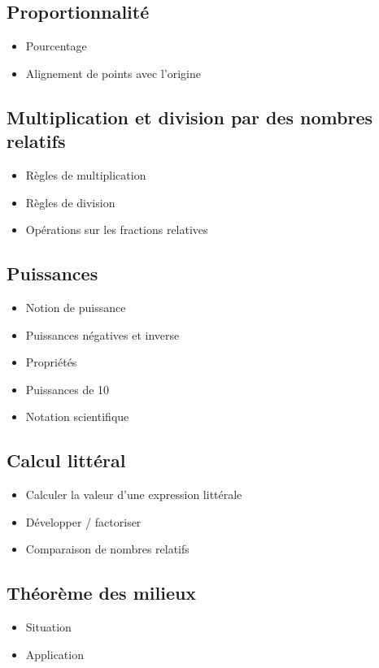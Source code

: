 \subsection{Proportionnalité}

\begin{itemize}
	\item Pourcentage
	\item Alignement de points avec l'origine
\end{itemize}

\subsection{Multiplication et division par des nombres relatifs}
\begin{itemize}
	\item Règles de multiplication
	\item Règles de division
	\item Opérations sur les fractions relatives
\end{itemize}

\subsection{Puissances}
\begin{itemize}
	\item Notion de puissance
	\item Puissances négatives et inverse
	\item Propriétés
	\item Puissances de 10
	\item Notation scientifique
\end{itemize}

\subsection{Calcul littéral}
\begin{itemize}
	\item Calculer la valeur d'une expression littérale
	\item Développer / factoriser
	\item Comparaison de nombres relatifs
\end{itemize}

\subsection{Théorème des milieux}
\begin{itemize}
	\item Situation 
	\item Application
\end{itemize}

